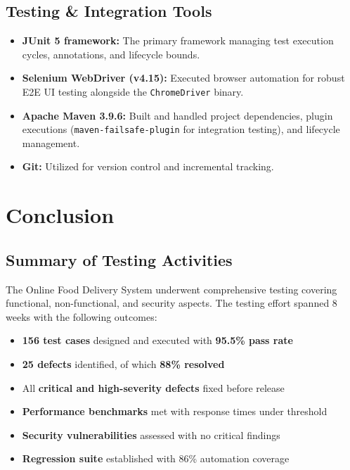 \documentclass[12pt,a4paper]{report}
\begin{document}
\section{Testing \& Integration Tools}
\begin{itemize}
    \item \textbf{JUnit 5 framework:} The primary framework managing test execution cycles, annotations, and lifecycle bounds.
    \item \textbf{Selenium WebDriver (v4.15):} Executed browser automation for robust E2E UI testing alongside the \texttt{ChromeDriver} binary.
    \item \textbf{Apache Maven 3.9.6:} Built and handled project dependencies, plugin executions (\texttt{maven-failsafe-plugin} for integration testing), and lifecycle management.
    \item \textbf{Git:} Utilized for version control and incremental tracking.
\end{itemize}

\chapter{Conclusion}

\section{Summary of Testing Activities}

The Online Food Delivery System underwent comprehensive testing covering functional, non-functional, and security aspects. The testing effort spanned 8 weeks with the following outcomes:

\begin{itemize}
    \item \textbf{156 test cases} designed and executed with \textbf{95.5\% pass rate}
    \item \textbf{25 defects} identified, of which \textbf{88\% resolved}
    \item All \textbf{critical and high-severity defects} fixed before release
    \item \textbf{Performance benchmarks} met with response times under threshold
    \item \textbf{Security vulnerabilities} assessed with no critical findings
    \item \textbf{Regression suite} established with 86\% automation coverage
\end{itemize}
\end{document}
